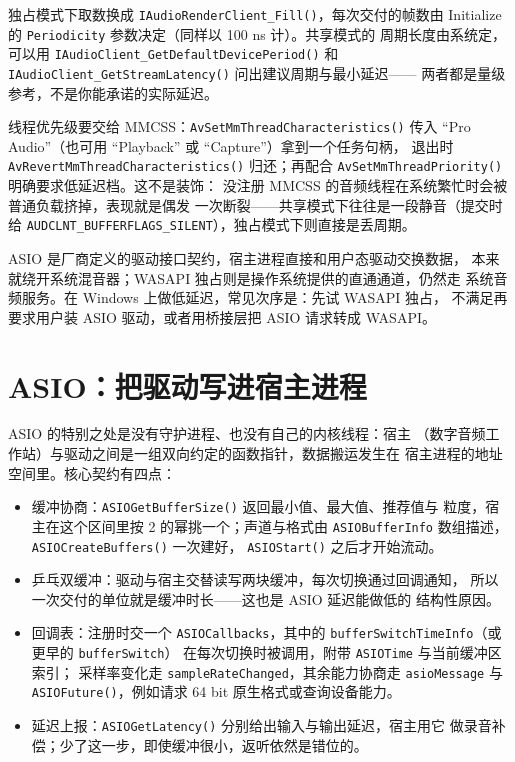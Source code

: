 \documentclass[12pt,a4paper,fontset=fandol]{ctexbook}
\newcommand{\Fn}[1]{\texttt{#1()}}
\newcommand{\Tp}[1]{\texttt{#1}}
\newcommand{\Bk}{\discretionary{}{}{}}
\begin{document}
独占模式下取数换成 \Fn{IAudioRenderClient\_Fill}，每次交付的帧数由
Initialize 的 \Tp{Periodicity} 参数决定（同样以 100 ns 计）。共享模式的
周期长度由系统定，可以用 \Fn{IAudioClient\_GetDefaultDevicePeriod}
和 \Fn{IAudioClient\_GetStreamLatency} 问出建议周期与最小延迟——
两者都是量级参考，不是你能承诺的实际延迟。

线程优先级要交给 MMCSS：\Fn{Av{\Bk}Set{\Bk}Mm{\Bk}Thread{\Bk}Characteristics} 传入
``Pro Audio''（也可用 ``Playback'' 或 ``Capture''）拿到一个任务句柄，
退出时 \Fn{Av{\Bk}Revert{\Bk}Mm{\Bk}Thread{\Bk}Characteristics} 归还；再配合
\Fn{Av{\Bk}Set{\Bk}Mm{\Bk}Thread{\Bk}Priority} 明确要求低延迟档。这不是装饰：
没注册 MMCSS 的音频线程在系统繁忙时会被普通负载挤掉，表现就是偶发
一次断裂——共享模式下往往是一段静音（提交时给
\Tp{AUDCLNT\_{\Bk}BUFFERFLAGS\_{\Bk}SILENT}），独占模式下则直接是丢周期。

\begin{note}[title={ASIO 与 WASAPI 独占不是同一件事}]
ASIO 是厂商定义的驱动接口契约，宿主进程直接和用户态驱动交换数据，
本来就绕开系统混音器；WASAPI 独占则是操作系统提供的直通通道，仍然走
系统音频服务。在 Windows 上做低延迟，常见次序是：先试 WASAPI 独占，
不满足再要求用户装 ASIO 驱动，或者用桥接层把 ASIO 请求转成 WASAPI。
\end{note}

\section{ASIO：把驱动写进宿主进程}
\label{sec:ch03-asio}

ASIO 的特别之处是没有守护进程、也没有自己的内核线程：宿主
（数字音频工作站）与驱动之间是一组双向约定的函数指针，数据搬运发生在
宿主进程的地址空间里。核心契约有四点：

\begin{itemize}
  \item 缓冲协商：\Fn{ASIOGet{\Bk}Buffer{\Bk}Size} 返回最小值、最大值、推荐值与
        粒度，宿主在这个区间里按 2 的幂挑一个；声道与格式由
        \Tp{ASIOBuffer{\Bk}Info} 数组描述，\Fn{ASIOCreate{\Bk}Buffers} 一次建好，
        \Fn{ASIOStart} 之后才开始流动。
  \item 乒乓双缓冲：驱动与宿主交替读写两块缓冲，每次切换通过回调通知，
        所以一次交付的单位就是缓冲时长——这也是 ASIO 延迟能做低的
        结构性原因。
  \item 回调表：注册时交一个 \Tp{ASIOCallbacks}，其中的
        \Tp{bufferSwitchTimeInfo}（或更早的 \Tp{bufferSwitch}）
        在每次切换时被调用，附带 \Tp{ASIOTime} 与当前缓冲区索引；
        采样率变化走 \Tp{sampleRateChanged}，其余能力协商走
        \Tp{asioMessage} 与 \Fn{ASIOFuture}，例如请求 64 bit
        原生格式或查询设备能力。
  \item 延迟上报：\Fn{ASIOGetLatency} 分别给出输入与输出延迟，宿主用它
        做录音补偿；少了这一步，即使缓冲很小，返听依然是错位的。
\end{itemize}
\end{document}
